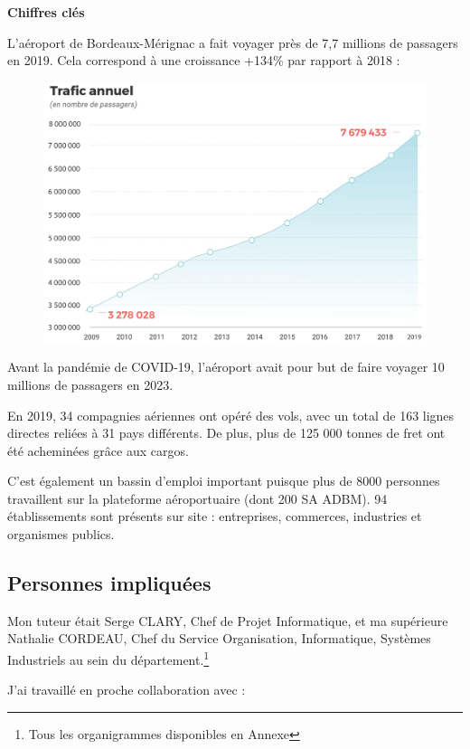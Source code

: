 \newpage

\textbf{Chiffres clés}\newline

L'aéroport de Bordeaux-Mérignac a fait voyager près de 7,7 millions de passagers en 2019. Cela correspond à une croissance +134\% par rapport à 2018 :

\begin{figure}[hbt!]
    \centering
    \includegraphics[width=12cm]{Images/trafic.jpg}
    \label{fig:trafic}
\end{figure}

Avant la pandémie de COVID-19, l'aéroport avait pour but de faire voyager 10 millions de passagers en 2023.

En 2019, 34 compagnies aériennes ont opéré des vols, avec un total de 163 lignes directes reliées à 31 pays différents.
De plus, plus de 125 000 tonnes de fret ont été acheminées grâce aux cargos.

C'est également un bassin d'emploi important puisque plus de 8000 personnes travaillent sur la plateforme aéroportuaire (dont 200 SA ADBM).
94 établissements sont présents sur site : entreprises, commerces, industries et organismes publics.

\subsection{Personnes impliquées}


Mon tuteur était Serge CLARY, Chef de Projet Informatique, et ma supérieure Nathalie CORDEAU, Chef du Service Organisation, Informatique, Systèmes Industriels au sein du département.\footnote{Tous les organigrammes disponibles en Annexe}

J'ai travaillé en proche collaboration avec :\newline

